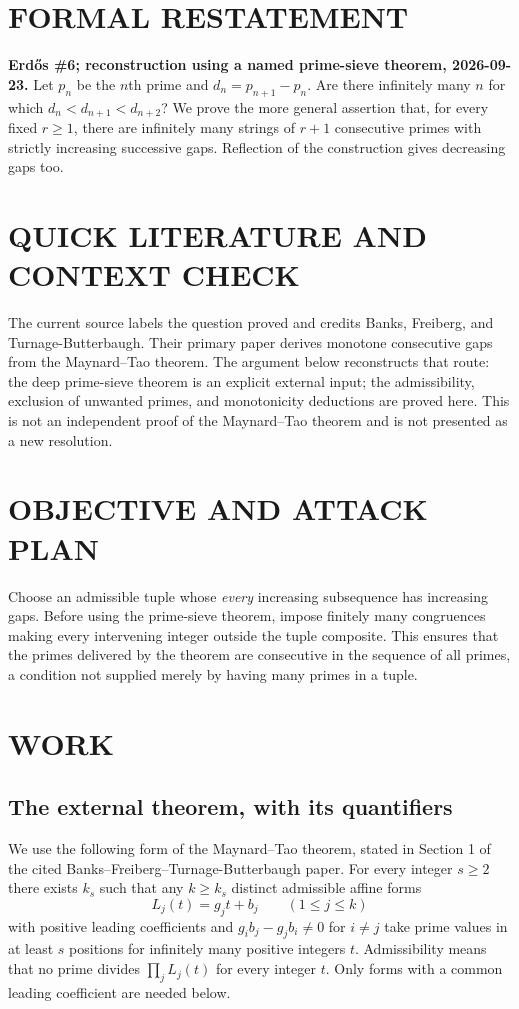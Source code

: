 \section{FORMAL RESTATEMENT}
\textbf{Erd\H{o}s \#6; reconstruction using a named prime-sieve theorem, 2026-09-23.}
Let $p_n$ be the $n$th prime and $d_n=p_{n+1}-p_n$. Are there infinitely many $n$ for which $d_n<d_{n+1}<d_{n+2}$? We prove the more general assertion that, for every fixed $r\ge1$, there are infinitely many strings of $r+1$ consecutive primes with strictly increasing successive gaps. Reflection of the construction gives decreasing gaps too.

\section{QUICK LITERATURE AND CONTEXT CHECK}
The current source labels the question proved and credits Banks, Freiberg, and Turnage-Butterbaugh. Their primary paper derives monotone consecutive gaps from the Maynard--Tao theorem. The argument below reconstructs that route: the deep prime-sieve theorem is an explicit external input; the admissibility, exclusion of unwanted primes, and monotonicity deductions are proved here. This is not an independent proof of the Maynard--Tao theorem and is not presented as a new resolution.

\section{OBJECTIVE AND ATTACK PLAN}
Choose an admissible tuple whose \emph{every} increasing subsequence has increasing gaps. Before using the prime-sieve theorem, impose finitely many congruences making every intervening integer outside the tuple composite. This ensures that the primes delivered by the theorem are consecutive in the sequence of all primes, a condition not supplied merely by having many primes in a tuple.

\section{WORK}
\subsection{The external theorem, with its quantifiers}
We use the following form of the Maynard--Tao theorem, stated in Section 1 of the cited Banks--Freiberg--Turnage-Butterbaugh paper. For every integer $s\ge2$ there exists $k_s$ such that any $k\ge k_s$ distinct admissible affine forms
\[
 L_j(t)=g_jt+b_j\qquad(1\le j\le k)
\]
with positive leading coefficients and $g_ib_j-g_jb_i\ne0$ for $i\ne j$ take prime values in at least $s$ positions for infinitely many positive integers $t$. Admissibility means that no prime divides $\prod_jL_j(t)$ for every integer $t$. Only forms with a common leading coefficient are needed below.

